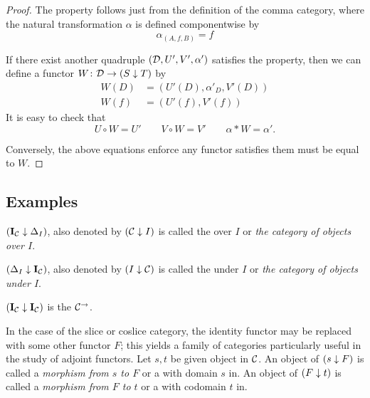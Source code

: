   \begin{proof}
    The property follows just from the definition of the comma category, where the natural transformation $\alpha$ is defined componentwise by
    \begin{equation*}
      \alpha_{(A,f,B)}=f
    \end{equation*}

    If there exist another quadruple $({\cal D},U',V',\alpha')$ satisfies the property, then we can define a functor $W\colon{\cal D}\to (S\downarrow T)$ by
    \begin{align*}
      W(D) &= (U'(D),\alpha'_D ,V'(D)) \\
      W(f) &= (U'(f), V'(f))
    \end{align*}
    It is easy to check that
    \begin{equation*}
      U\circ W = U'\qquad V\circ W = V'\qquad \alpha\ast W = \alpha'.
    \end{equation*}

    Conversely, the above equations enforce any functor satisfies them must be equal to $W$.
  \end{proof}

\subsection{Examples}
  \begin{exam}%
    $(\operatorname{\mathbf{I}}_{{\cal C}} \downarrow \Delta_I)$, also denoted by $({\cal C} \downarrow I)$ is called the  over $I$ or \emph{the category of objects over $I$}.
  \end{exam}

  \begin{exam}%
    $(\Delta_I \downarrow \operatorname{\mathbf{I}}_{{\cal C}})$, also denoted by $(I \downarrow {\cal C})$ is called the  under $I$ or \emph{the category of objects under $I$}.
  \end{exam}

  \begin{exam}%
    $(\operatorname{\mathbf{I}}_{{\cal C}}\downarrow\operatorname{\mathbf{I}}_{{\cal C}})$ is the  ${\cal C}^{\to}$.
  \end{exam}

  \begin{exam}
    In the case of the slice or coslice category, the identity functor may be replaced with some other functor $F$; this yields a family of categories particularly useful in the study of adjoint functors. Let $s,t$ be given object in ${\cal C}$.
    An object of $(s\downarrow F)$ is called a \emph{morphism from $s$ to $F$} or a  with domain $s$ in.
    An object of $(F\downarrow t)$ is called a \emph{morphism from $F$ to $t$} or a  with codomain $t$ in.
  \end{exam}

